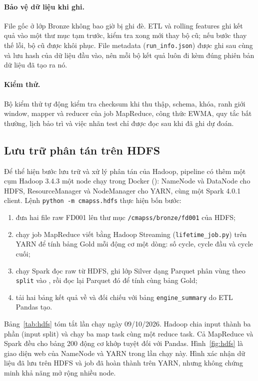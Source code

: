 \paragraph{Bảo vệ dữ liệu khi ghi.} File gốc ở lớp Bronze không bao giờ bị ghi đè.
ETL và rolling features ghi kết quả vào một thư mục tạm trước, kiểm tra xong mới
thay bộ cũ; nếu bước thay thế lỗi, bộ cũ được khôi phục. File metadata
(\texttt{run\_info.json}) được ghi sau cùng và lưu hash của dữ liệu đầu vào, nên mỗi
bộ kết quả luôn đi kèm đúng phiên bản dữ liệu đã tạo ra nó.

\paragraph{Kiểm thử.} Bộ kiểm thử tự động kiểm tra checksum khi thu thập, schema,
khóa, ranh giới window, mapper và reducer của job MapReduce, công thức EWMA, quy tắc
bất thường, lịch bảo trì và việc nhãn test chỉ được đọc sau khi đã ghi dự đoán.

\subsection{Lưu trữ phân tán trên HDFS}
\label{sec:dp-hdfs}
Để thể hiện bước lưu trữ và xử lý phân tán của Hadoop, pipeline có thêm một cụm
Hadoop 3.4.3 một node chạy trong Docker ():
NameNode và DataNode cho HDFS, ResourceManager và NodeManager cho YARN, cùng một
Spark 4.0.1 client. Lệnh \texttt{python -m cmapss.hdfs} thực hiện bốn bước:
\begin{enumerate}
\item đưa hai file raw FD001 lên thư mục \texttt{/cmapss/bronze/fd001} của HDFS;
\item chạy job MapReduce viết bằng Hadoop Streaming (\texttt{lifetime\_job.py}) trên
      YARN để tính bảng Gold mỗi động cơ một dòng: số cycle, cycle đầu và cycle cuối;
\item chạy Spark đọc raw từ HDFS, ghi lớp Silver dạng Parquet phân vùng theo
      \texttt{split} vào , rồi đọc lại Parquet
      đó để tính cùng bảng Gold;
\item tải hai bảng kết quả về và đối chiếu với bảng \texttt{engine\_summary} do ETL
      Pandas tạo.
\end{enumerate}


Bảng~\ref{tab:hdfs} tóm tắt lần chạy ngày 09/10/2026. Hadoop chia input thành ba phần
(input split) và chạy ba map task cùng một reduce task. Cả MapReduce và Spark đều cho
bảng 200 động cơ khớp tuyệt đối với Pandas. Hình~\ref{fig:hdfs} là giao diện web của
NameNode và YARN trong lần chạy này. Hình xác nhận dữ liệu đã lưu trên HDFS và
job đã hoàn thành trên YARN, nhưng không chứng minh khả năng mở rộng nhiều node.

